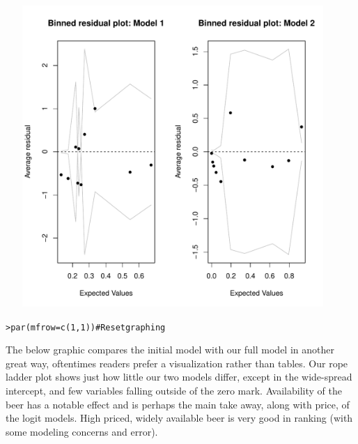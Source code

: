 \documentclass[12pt]{article}\usepackage[]{graphicx}\usepackage[]{color}
\makeatletter
\newcommand{\hlnum}[1]{\textcolor[rgb]{0.82,0.78,0.62}{#1}}%
\newcommand{\hlcom}[1]{\textcolor[rgb]{0.404,0.408,0.42}{#1}}%
\newcommand{\hlstd}[1]{\textcolor[rgb]{0.882,0.878,0.898}{#1}}%
\newcommand{\hlkwc}[1]{\textcolor[rgb]{0.812,0.522,0.388}{#1}}%
\newcommand{\hlkwd}[1]{\textcolor[rgb]{0.733,0.388,0.812}{#1}}%
\newenvironment{kframe}{%
 \def\at@end@of@kframe{}%
 \ifinner\ifhmode%
  \def\at@end@of@kframe{\end{minipage}}%
  \begin{minipage}{\columnwidth}%
 \fi\fi%
 \def\FrameCommand##1{\hskip\@totalleftmargin \hskip-\fboxsep
 \colorbox{shadecolor}{##1}\hskip-\fboxsep
     \hskip-\linewidth \hskip-\@totalleftmargin \hskip\columnwidth}%
 \MakeFramed {\advance\hsize-\width
   \@totalleftmargin\z@ \linewidth\hsize
   \@setminipage}}%
 {\par\unskip\endMakeFramed%
 \at@end@of@kframe}
\newenvironment{knitrout}{}{} %
\makeatother
\begin{document}
\begin{flushleft}
\begin{center}
\begin{knitrout}
\includegraphics[width=5in,height=4.5in]{figure/binned-1} 
\begin{kframe}\begin{alltt}
\hlstd{> }\hlkwd{par}\hlstd{(}\hlkwc{mfrow}\hlstd{=}\hlkwd{c}\hlstd{(}\hlnum{1}\hlstd{,}\hlnum{1}\hlstd{))} \hlcom{# Reset graphing}
\end{alltt}
\end{kframe}
\end{knitrout}
\end{center}


The below graphic compares the initial model with our full model in another great way, oftentimes readers prefer a visualization rather than tables. Our rope ladder plot shows just how little our two models differ, except in the wide-spread intercept, and few variables falling outside of the zero mark. Availability of the beer has a notable effect and is perhaps the main take away, along with price, of the logit models. High priced, widely available beer is very good in ranking (with some modeling concerns and error).


\end{flushleft}
\end{document}
